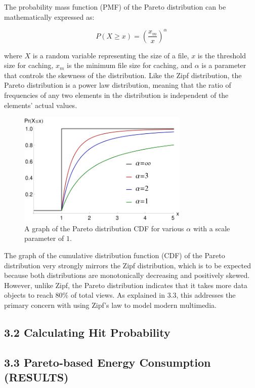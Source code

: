 \documentclass[
	a4paper, %
	10pt, %
	unnumberedsections, %
	twoside, %
]{LTJournalArticle}
\begin{document}
The probability mass function (PMF) of the Pareto distribution can be mathematically expressed as:

\[
    P(X \geq x) = \left(\frac{x_m}{x}\right)^\alpha
\]

where $X$ is a random variable representing the size of a file, $x$ is the threshold size for caching, $x_m$ is the minimum file size for caching, and $\alpha$ is a parameter that controls the skewness of the distribution. Like the Zipf distribution, the Pareto distribution is a power law distribution, meaning that the ratio of frequencies of any two elements in the distribution is independent of the elements' actual values.  

\begin{figure}[h]
	\begin{center}
		\includegraphics[width=8.1cm]{pareto.png}
	\end{center}
	\caption{A graph of the Pareto distribution CDF for various $\alpha$ with a scale parameter of $1$.}	
\end{figure}

The graph of the cumulative distribution function (CDF) of the Pareto distribution very strongly mirrors the Zipf distribution, which is to be expected because both distributions are monotonically decreasing and positively skewed. However, unlike Zipf, the Pareto distribution indicates that it takes more data objects to reach 80\% of total views. As explained in $3.3$, this addresses the primary concern with using Zipf's law to model modern multimedia. 

\subsection{3.2 Calculating Hit Probability}
\subsection{3.3 Pareto-based Energy Consumption (RESULTS)}
\end{document}
